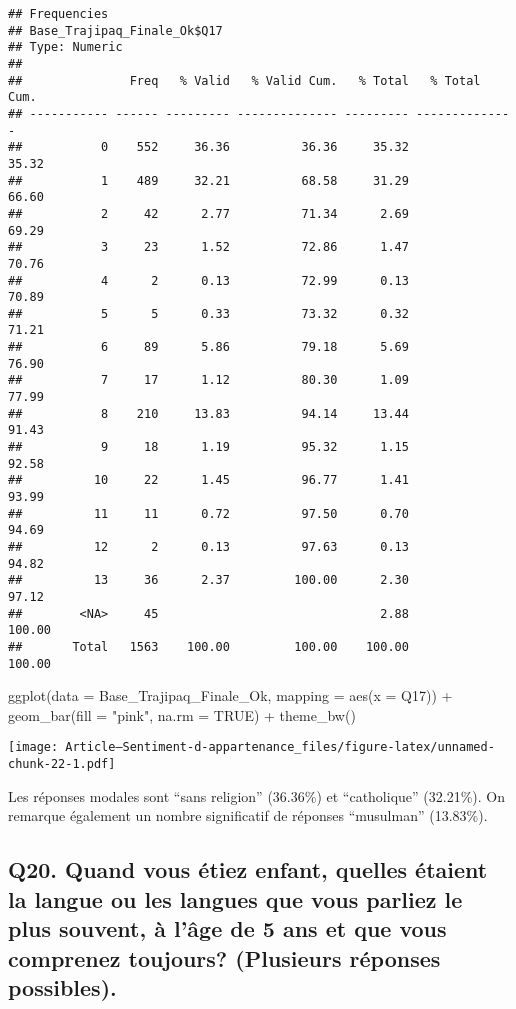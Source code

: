 \documentclass[
]{article}
\newenvironment{Shaded}{\begin{snugshade}}{\end{snugshade}}
\newcommand{\AttributeTok}[1]{\textcolor[rgb]{0.77,0.63,0.00}{#1}}
\newcommand{\ConstantTok}[1]{\textcolor[rgb]{0.00,0.00,0.00}{#1}}
\newcommand{\FunctionTok}[1]{\textcolor[rgb]{0.00,0.00,0.00}{#1}}
\newcommand{\NormalTok}[1]{#1}
\newcommand{\SpecialCharTok}[1]{\textcolor[rgb]{0.00,0.00,0.00}{#1}}
\newcommand{\StringTok}[1]{\textcolor[rgb]{0.31,0.60,0.02}{#1}}
\begin{document}
\begin{verbatim}
## Frequencies  
## Base_Trajipaq_Finale_Ok$Q17  
## Type: Numeric  
## 
##               Freq   % Valid   % Valid Cum.   % Total   % Total Cum.
## ----------- ------ --------- -------------- --------- --------------
##           0    552     36.36          36.36     35.32          35.32
##           1    489     32.21          68.58     31.29          66.60
##           2     42      2.77          71.34      2.69          69.29
##           3     23      1.52          72.86      1.47          70.76
##           4      2      0.13          72.99      0.13          70.89
##           5      5      0.33          73.32      0.32          71.21
##           6     89      5.86          79.18      5.69          76.90
##           7     17      1.12          80.30      1.09          77.99
##           8    210     13.83          94.14     13.44          91.43
##           9     18      1.19          95.32      1.15          92.58
##          10     22      1.45          96.77      1.41          93.99
##          11     11      0.72          97.50      0.70          94.69
##          12      2      0.13          97.63      0.13          94.82
##          13     36      2.37         100.00      2.30          97.12
##        <NA>     45                               2.88         100.00
##       Total   1563    100.00         100.00    100.00         100.00
\end{verbatim}

\begin{Shaded}
\begin{Highlighting}[]
\FunctionTok{ggplot}\NormalTok{(}\AttributeTok{data =}\NormalTok{ Base\_Trajipaq\_Finale\_Ok, }\AttributeTok{mapping =} \FunctionTok{aes}\NormalTok{(}\AttributeTok{x =}\NormalTok{ Q17)) }\SpecialCharTok{+}
  \FunctionTok{geom\_bar}\NormalTok{(}\AttributeTok{fill =} \StringTok{"pink"}\NormalTok{, }\AttributeTok{na.rm =} \ConstantTok{TRUE}\NormalTok{) }\SpecialCharTok{+}
  \FunctionTok{theme\_bw}\NormalTok{()}
\end{Highlighting}
\end{Shaded}

\texttt{[image: Article---Sentiment-d-appartenance\_files/figure-latex/unnamed-chunk-22-1.pdf]}

Les réponses modales sont ``sans religion'' (36.36\%) et ``catholique''
(32.21\%). On remarque également un nombre significatif de réponses
``musulman'' (13.83\%).

\hypertarget{q20.-quand-vous-uxe9tiez-enfant-quelles-uxe9taient-la-langue-ou-les-langues-que-vous-parliez-le-plus-souvent-uxe0-luxe2ge-de-5-ans-et-que-vous-comprenez-toujours-plusieurs-ruxe9ponses-possibles.}{%
\subsection{Q20. Quand vous étiez enfant, quelles étaient la langue ou
les langues que vous parliez le plus souvent, à l'âge de 5 ans et que
vous comprenez toujours? (Plusieurs réponses
possibles).}\label{q20.-quand-vous-uxe9tiez-enfant-quelles-uxe9taient-la-langue-ou-les-langues-que-vous-parliez-le-plus-souvent-uxe0-luxe2ge-de-5-ans-et-que-vous-comprenez-toujours-plusieurs-ruxe9ponses-possibles.}}
\end{document}

